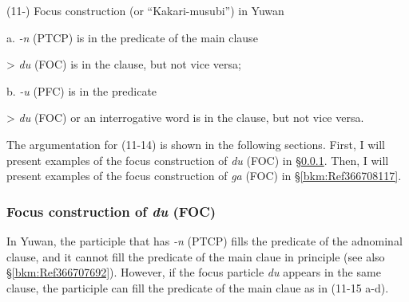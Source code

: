 (11\nobreakdash-)   Focus construction (or “Kakari-musubi”) in Yuwan

a.   \textit{{}-n} (PTCP) is in the predicate of the main clause

> \textit{du} (FOC) is in the clause, but not vice versa;

b.   \textit{{}-u} (PFC) is in the predicate

> \textit{du} (FOC) or an interrogative word is in the clause, but not vice versa.

The argumentation for (11-14) is shown in the following sections. First, I will present examples of the focus construction of \textit{du} (FOC) in §\ref{bkm:Ref366708110}. Then, I will present examples of the focus construction of \textit{ga} (FOC) in §\ref{bkm:Ref366708117}.

\subsubsection{Focus construction of \textit{du} (FOC)}
\label{bkm:Ref366708110}\hypertarget{RefHeadingToc395697262}{}
In Yuwan, the participle that has \textit{{}-n} (PTCP) fills the predicate of the adnominal clause, and it cannot fill the predicate of the main claue in principle (see also §\ref{bkm:Ref366707692}). However, if the focus particle \textit{du} appears in the same clause, the participle can fill the predicate of the main claue as in (11-15 a-d).

\tablefirsthead{}

